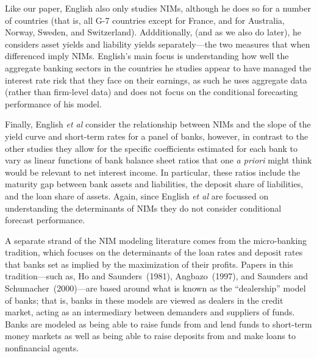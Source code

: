 \documentclass[11pt]{article}
\begin{document}
Like our paper, English also only studies NIMs, although he does so for a number of countries (that is, all G-7 countries except for France, and for Australia, Norway, Sweden, and Switzerland).  Addditionally, (and as we also do later), he considers asset yields and liability yields separately---the two measures that when differenced imply NIMs.  English's main focus is understanding how well the aggregate banking sectors in the countries he studies appear to have managed the interest rate risk that they face on their earnings, as such he uses aggregate data (rather than firm-level data) and does not focus on the conditional forecasting performance of his model.

Finally, English \textit{et al} consider the relationship between NIMs and the slope of the yield curve and short-term rates for a panel of banks, however, in contrast to the other studies they allow for the specific coefficients estimated for each bank to vary as linear functions of bank balance sheet ratios that one \textit{a priori} might think would be relevant to net interest income.  In particular, these ratios include the maturity gap between bank assets and liabilities, the deposit share of liabilities, and the loan share of assets. Again, since English \textit{et al} are focussed on understanding the determinants of NIMs they do not consider conditional forecast performance.

A separate strand of the NIM modeling literature comes from the micro-banking tradition, which focuses on the determinants of the loan rates and deposit rates that banks set as implied by the maximization of their profits. Papers in this tradition---such as, Ho and Saunders~(1981), Angbazo~(1997), and Saunders and Schumacher~(2000)---are based around what is known as the ``dealership'' model of banks; that is, banks in these models are viewed as dealers in the credit market, acting as an intermediary between demanders and suppliers of funds.  Banks are modeled as being able to raise funds from and lend funds to short-term money markets as well as being able to raise deposits from and make loans to nonfinancial agents.
\end{document}
